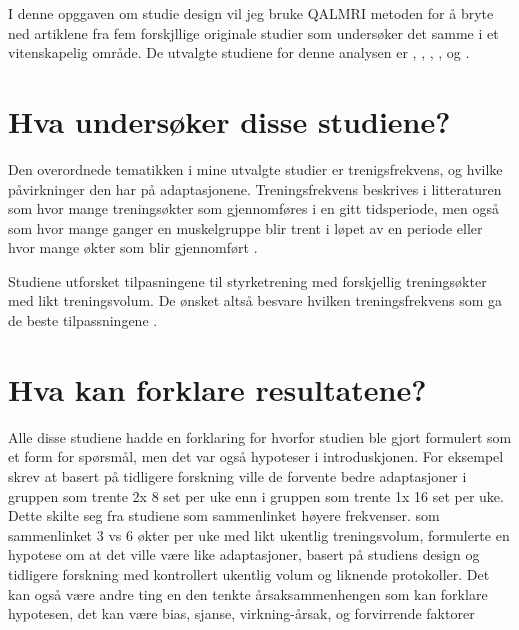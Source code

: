 \documentclass[
]{book}
\begin{document}
I denne opggaven om studie design vil jeg bruke QALMRI metoden \citep{brosowsky2020} for å bryte ned artiklene fra fem forskjllige originale studier som undersøker det samme i et vitenskapelig område. De utvalgte studiene for denne analysen er \citep{johnsen2021}, \citep{brigatto2019}, \citep{gentil2018}, \citep{saric2019}, og \citep{lasevicius2019}.

\hypertarget{hva-undersuxf8ker-disse-studiene}{%
\section{Hva undersøker disse studiene?}\label{hva-undersuxf8ker-disse-studiene}}

Den overordnede tematikken i mine utvalgte studier er trenigsfrekvens, og hvilke påvirkninger den har på adaptasjonene. Treningsfrekvens beskrives i litteraturen som hvor mange treningsøkter som gjennomføres i en gitt tidsperiode, men også som hvor mange ganger en muskelgruppe blir trent i løpet av en periode eller hvor mange økter som blir gjennomført \citep{kraemer2004, schoenfeld2016}.

Studiene utforsket tilpasningene til styrketrening med forskjellig treningsøkter med likt treningsvolum. De ønsket altså besvare hvilken treningsfrekvens som ga de beste tilpassningene \citep{johnsen2021, brigatto2019, gentil2018, saric2019, lasevicius2019}.

\hypertarget{hva-kan-forklare-resultatene}{%
\section{Hva kan forklare resultatene?}\label{hva-kan-forklare-resultatene}}

Alle disse studiene hadde en forklaring for hvorfor studien ble gjort formulert som et form for spørsmål, men det var også hypoteser i introduskjonen. For eksempel skrev \citep{brigatto2019} at basert på tidligere forskning ville de forvente bedre adaptasjoner i gruppen som trente 2x 8 set per uke enn i gruppen som trente 1x 16 set per uke. Dette skilte seg fra studiene som sammenlinket høyere frekvenser. \citep{saric2019} som sammenlinket 3 vs 6 økter per uke med likt ukentlig treningsvolum, formulerte en hypotese om at det ville være like adaptasjoner, basert på studiens design og tidligere forskning med kontrollert ukentlig volum og liknende protokoller. Det kan også være andre ting en den tenkte årsaksammenhengen som kan forklare hypotesen, det kan være bias, sjanse, virkning-årsak, og forvirrende faktorer \citep{hulley_2013}
\end{document}
